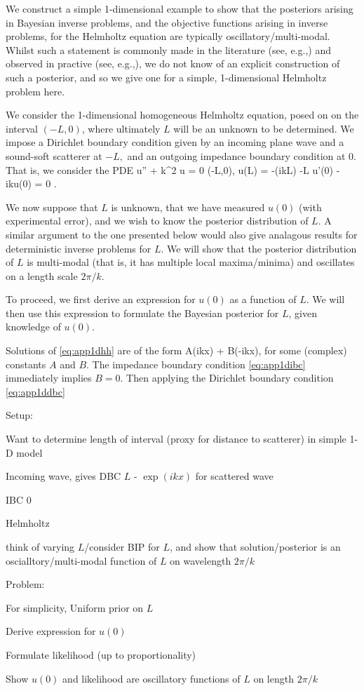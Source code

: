 We construct a simple 1-dimensional example to show that the posteriors arising in Bayesian inverse problems, and the objective functions arising in inverse problems, for the Helmholtz equation are typically oscillatory/multi-modal. Whilst such a statement is commonly made in the literature (see, e.g.,) and observed in practive (see, e.g.,), we do not know of an explicit construction of such a posterior, and so we give one for a simple, 1-dimensional Helmholtz problem here.

We consider the 1-dimensional homogeneous Helmholtz equation, posed on on the interval $(-L,0)$, where ultimately $L$ will be an unknown to be determined. We impose a Dirichlet boundary condition given by an incoming plane wave and a sound-soft scatterer at $-L,$ and an outgoing impedance boundary condition at 0. That is, we consider the PDE
\beq\label{eq:app1dhh}
u'' + k^2 u = 0 \tin (-L,0),
\eeq
\beq\label{eq:app1dibc}
u(L) = -\exp(ikL) \tat -L
\eeq
\beq\label{eq:app1ddbc}
u'(0) - iku(0) = 0 .
\eeq

We now suppose that $L$ is unknown, that we have measured $u(0)$ (with experimental error), and we wish to know the posterior distribution of $L$. A similar argument to the one presented below would also give analagous results for deterministic inverse problems for $L$. We will show that the posterior distribution of $L$ is multi-modal (that is, it has multiple local maxima/minima) and oscillates on a length scale $2\pi/k.$

To proceed, we first derive an expression for $u(0)$ as a function of $L$. We will then use this expression to formulate the Bayesian posterior for $L$, given knowledge of $u(0).$

Solutions of \eqref{eq:app1dhh} are of the form
\beqs
A\exp(ikx) + B\exp(-ikx),
\eeqs
for some (complex) constants $A$ and $B$. The impedance boundary condition \eqref{eq:app1dibc} immediately implies $B=0$. Then applying the Dirichlet boundary condition \eqref{eq:app1ddbc}

Setup:
\bit
\item Want to determine length of interval (proxy for distance to scatterer) in simple 1-D model
\item Incoming wave, gives DBC \@ $L$ - $\exp(ikx)$ for scattered wave
\item IBC \@ 0
\item Helmholtz
\item think of varying $L$/consider BIP for $L$, and show that solution/posterior is an oscialltory/multi-modal function of $L$ on wavelength $2\pi/k$  
\eit

Problem:
\bit
\item For simplicity, Uniform prior on $L$
\item Derive expression for $u(0)$
\item Formulate likelihood (up to proportionality)
\item Show $u(0)$ and likelihood are oscillatory functions of $L$ on length $2\pi/k$
\eit

